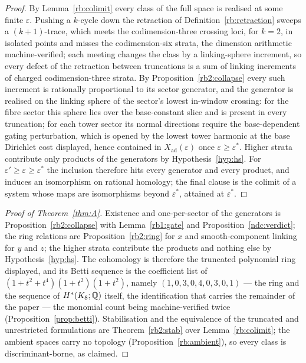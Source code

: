 \documentclass[11pt]{article}
\numberwithin{equation}{section}
\theoremstyle{plain}
\theoremstyle{definition}
\theoremstyle{remark}
\newcommand{\Xad}{X_{\mathrm{ad}}}
\begin{document}
\begin{proof}
By Lemma~\ref{rb:colimit} every class of the full space is realised
at some finite $\varepsilon$. Pushing a $k$-cycle down the
retraction of Definition~\ref{rb:retraction} sweeps a
$(k+1)$-trace, which meets the codimension-three crossing loci, for
$k = 2$, in isolated points and misses the codimension-six strata,
the dimension arithmetic machine-verified; each meeting changes the
class by a linking-sphere increment, so every defect of the
retraction between truncations is a sum of linking increments of
charged codimension-three strata. By
Proposition~\ref{rb2:collapse} every such increment is rationally
proportional to its sector generator, and the generator is realised
on the linking sphere of the sector's lowest in-window crossing:
for the fibre sector this sphere lies over the base-constant slice
and is present in every truncation; for each tower sector its
normal directions require the base-dependent gating perturbation,
which is opened by the lowest tower harmonic at the base Dirichlet
cost displayed, hence contained in $\Xad(\varepsilon)$ once
$\varepsilon \geq \varepsilon^{*}$. Higher strata contribute only
products of the generators by Hypothesis~\ref{hyp:hs}. For
$\varepsilon' \geq \varepsilon \geq \varepsilon^{*}$ the inclusion
therefore hits every generator and every product, and induces an
isomorphism on rational homology; the final clause is the colimit
of a system whose maps are isomorphisms beyond $\varepsilon^{*}$,
attained at $\varepsilon^{*}$.
\end{proof}

\begin{proof}[Proof of Theorem~\textup{\ref{thm:A}}]
Existence and one-per-sector of the generators is
Proposition~\ref{rb2:collapse} with Lemma~\ref{rb1:gate} and
Proposition~\ref{ndc:verdict}; the ring relations are
Proposition~\ref{rb2:ring} for $x$ and smooth-component linking for
$y$ and $z$; the higher strata contribute the products and nothing
else by Hypothesis~\ref{hyp:hs}. The cohomology is therefore the
truncated polynomial ring displayed, and its Betti sequence is the
coefficient list of $(1 + t^{2} + t^{4})(1 + t^{2})(1 + t^{2})$,
namely $(1, 0, 3, 0, 4, 0, 3, 0, 1)$ --- the ring and the sequence
of $H^{*}(K_8; \mathbb{Q})$ itself, the identification that carries the
remainder of the paper --- the monomial count being
machine-verified twice (Proposition~\ref{prop:betti}).
Stabilisation and the equivalence of the truncated and unrestricted
formulations are Theorem~\ref{rb2:stab} over
Lemma~\ref{rb:colimit}; the ambient spaces carry no topology
(Proposition~\ref{rb:ambient}), so every class is
discriminant-borne, as claimed.
\end{proof}
\end{document}

